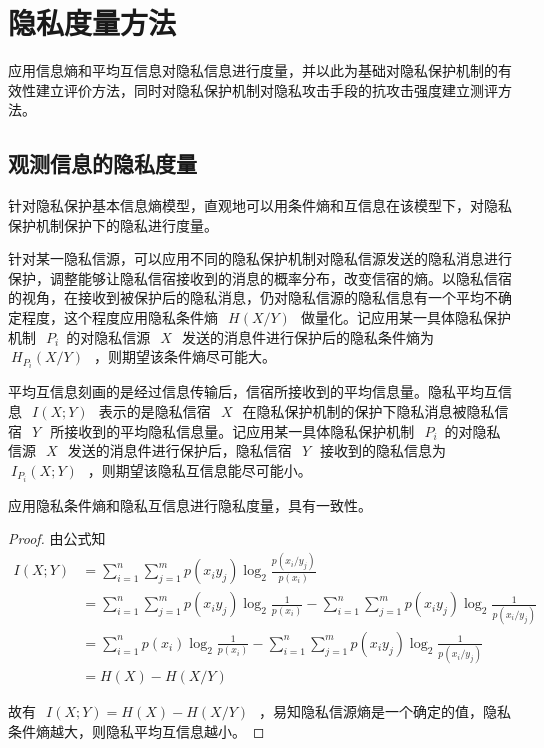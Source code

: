 \section{隐私度量方法}\label{Privacy measures}
应用信息熵和平均互信息对隐私信息进行度量，并以此为基础对隐私保护机制的有效性建立评价方法，同时对隐私保护机制对隐私攻击手段的抗攻击强度建立测评方法。

\subsection{观测信息的隐私度量}

针对隐私保护基本信息熵模型，直观地可以用条件熵和互信息在该模型下，对隐私保护机制保护下的隐私进行度量。

针对某一隐私信源，可以应用不同的隐私保护机制对隐私信源发送的隐私消息进行保护，调整能够让隐私信宿接收到的消息的概率分布，改变信宿的熵。以隐私信宿的视角，在接收到被保护后的隐私消息，仍对隐私信源的隐私信息有一个平均不确定程度，这个程度应用隐私条件熵~$~H(X/Y)~$~做量化。记应用某一具体隐私保护机制~$~P_{i}$~的对隐私信源~$~X~$~发送的消息件进行保护后的隐私条件熵为~$~H_{P_{i}}(X/Y)~$~，则期望该条件熵尽可能大。

平均互信息刻画的是经过信息传输后，信宿所接收到的平均信息量。隐私平均互信息~$~I(X;Y)~$~表示的是隐私信宿~$~X~$~在隐私保护机制的保护下隐私消息被隐私信宿~$~Y~$~所接收到的平均隐私信息量。记应用某一具体隐私保护机制~$~P_{i}$~的对隐私信源~$~X~$~发送的消息件进行保护后，隐私信宿~$~Y~$~接收到的隐私信息为~$~I_{P_{i}}(X;Y)~$~，则期望该隐私互信息能尽可能小。

\begin{property}
应用隐私条件熵和隐私互信息进行隐私度量，具有一致性。
\end{property}
\begin{proof}
	由公式知
	\begin{equation}
	\begin{split}
	I(X;Y)&=\sum_{i=1}^{n}\sum_{j=1}^{m}p(x_{i}y_{j})\log_{2}\frac{p(x_{i}/y_{j})}{p(x_{i})}\\
	&=\sum_{i=1}^{n}\sum_{j=1}^{m}p(x_{i}y_{j})\log_{2}\frac{1}{p(x_{i})}-\sum_{i=1}^{n}\sum_{j=1}^{m}p(x_{i}y_{j})\log_{2}\frac{1}{p(x_{i}/y_{j})}\\
	&=\sum_{i=1}^{n}p(x_{i})\log_{2}\frac{1}{p(x_{i})}-\sum_{i=1}^{n}\sum_{j=1}^{m}p(x_{i}y_{j})\log_{2}\frac{1}{p(x_{i}/y_{j})}\\
	&=H(X)-H(X/Y)
	\end{split}
	\end{equation}
	
	故有~$~I(X;Y)=H(X)-H(X/Y)~$~，易知隐私信源熵是一个确定的值，隐私条件熵越大，则隐私平均互信息越小。
\end{proof}


